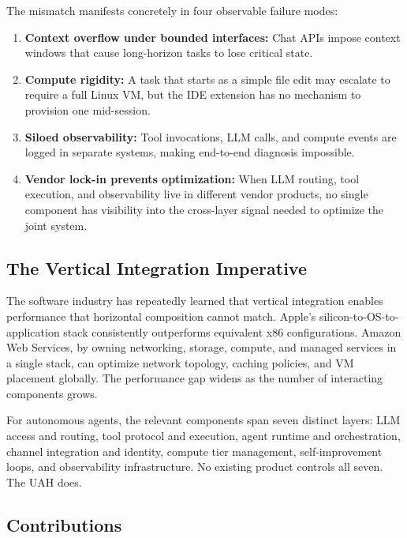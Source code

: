 \documentclass[11pt]{article}
\begin{document}
The mismatch manifests concretely in four observable failure modes:

\begin{enumerate}[leftmargin=1.5em]
    \item \textbf{Context overflow under bounded interfaces:} Chat APIs impose
          context windows that cause long-horizon tasks to lose critical state.
    \item \textbf{Compute rigidity:} A task that starts as a simple file edit
          may escalate to require a full Linux VM, but the IDE extension has no
          mechanism to provision one mid-session.
    \item \textbf{Siloed observability:} Tool invocations, LLM calls, and
          compute events are logged in separate systems, making end-to-end
          diagnosis impossible.
    \item \textbf{Vendor lock-in prevents optimization:} When LLM routing,
          tool execution, and observability live in different vendor products,
          no single component has visibility into the cross-layer signal needed
          to optimize the joint system.
\end{enumerate}

\subsection{The Vertical Integration Imperative}

The software industry has repeatedly learned that vertical integration enables
performance that horizontal composition cannot match. Apple's silicon-to-OS-to-
application stack consistently outperforms equivalent x86 configurations.
Amazon Web Services, by owning networking, storage, compute, and managed
services in a single stack, can optimize network topology, caching policies, and
VM placement globally. The performance gap widens as the number of interacting
components grows.

For autonomous agents, the relevant components span seven distinct layers:
LLM access and routing, tool protocol and execution, agent runtime and
orchestration, channel integration and identity, compute tier management,
self-improvement loops, and observability infrastructure. No existing product
controls all seven. The UAH does.

\subsection{Contributions}
\end{document}
